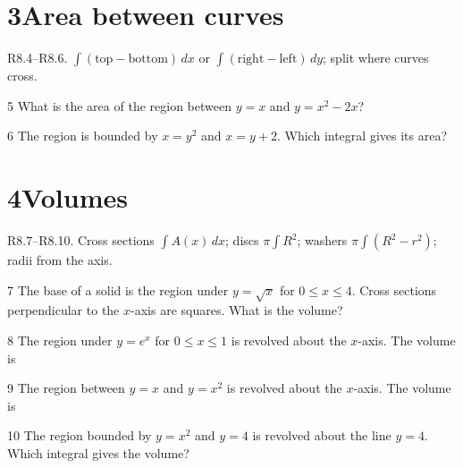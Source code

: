 \documentclass{apcalc}
\begin{document}
\section*{3\quad Area between curves}
\begin{setrule}R8.4–R8.6. $\int(\text{top}-\text{bottom})\,dx$ or $\int(\text{right}-\text{left})\,dy$; split where curves cross.\end{setrule}
\begin{q}{5}
What is the area of the region between $y=x$ and $y=x^2-2x$?
\end{q}
\begin{q}{6}
The region is bounded by $x=y^2$ and $x=y+2$. Which integral gives its area?
\end{q}
\section*{4\quad Volumes}
\begin{setrule}R8.7–R8.10. Cross sections $\int A(x)\,dx$; discs $\pi\int R^2$; washers $\pi\int(R^2-r^2)$; radii from the axis.\end{setrule}
\begin{q}{7}
The base of a solid is the region under $y=\sqrt x$ for $0\le x\le4$. Cross sections perpendicular to the $x$-axis are squares. What is the volume?
\end{q}
\begin{q}{8}
The region under $y=e^x$ for $0\le x\le1$ is revolved about the $x$-axis. The volume is
\end{q}
\begin{q}{9}
The region between $y=x$ and $y=x^2$ is revolved about the $x$-axis. The volume is
\end{q}
\begin{q}{10}
The region bounded by $y=x^2$ and $y=4$ is revolved about the line $y=4$. Which integral gives the volume?
\end{q}
\end{document}
